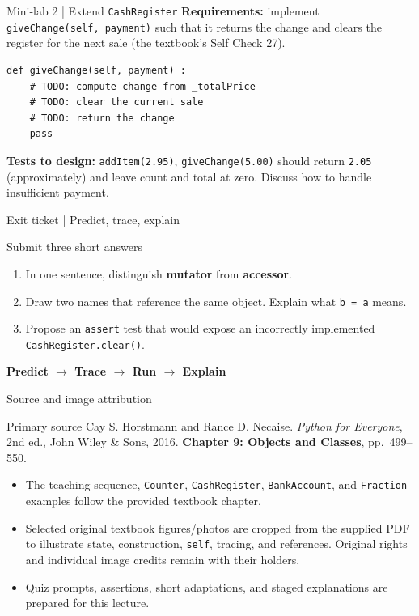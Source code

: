 \documentclass[10pt,aspectratio=169]{beamer}
\begin{document}
\begin{frame}[fragile]{Mini-lab 2 | Extend \texttt{CashRegister}}
\textbf{Requirements:} implement \texttt{giveChange(self, payment)} such that it returns the change and clears the register for the next sale (the textbook's Self Check 27).
\begin{lstlisting}
def giveChange(self, payment) :
    # TODO: compute change from _totalPrice
    # TODO: clear the current sale
    # TODO: return the change
    pass
\end{lstlisting}
\small\textbf{Tests to design:} \texttt{addItem(2.95)}, \texttt{giveChange(5.00)} should return \texttt{2.05} (approximately) and leave count and total at zero. Discuss how to handle insufficient payment.
\end{frame}

\begin{frame}{Exit ticket | Predict, trace, explain}
\begin{block}{Submit three short answers}
\begin{enumerate}\setlength{\itemsep}{8pt}
\item In one sentence, distinguish \textbf{mutator} from \textbf{accessor}.
\item Draw two names that reference the same object. Explain what \texttt{b = a} means.
\item Propose an \texttt{assert} test that would expose an incorrectly implemented \texttt{CashRegister.clear()}.
\end{enumerate}
\end{block}
\begin{center}\textbf{Predict $\longrightarrow$ Trace $\longrightarrow$ Run $\longrightarrow$ Explain}\end{center}
\end{frame}

\begin{frame}{Source and image attribution}
\begin{block}{Primary source}
Cay S. Horstmann and Rance D. Necaise. \emph{Python for Everyone}, 2nd ed., John Wiley \& Sons, 2016. \textbf{Chapter 9: Objects and Classes}, pp.~499--550.
\end{block}
\begin{itemize}
\item The teaching sequence, \texttt{Counter}, \texttt{CashRegister}, \texttt{BankAccount}, and \texttt{Fraction} examples follow the provided textbook chapter.
\item Selected original textbook figures/photos are cropped from the supplied PDF to illustrate state, construction, \texttt{self}, tracing, and references. Original rights and individual image credits remain with their holders.
\item Quiz prompts, assertions, short adaptations, and staged explanations are prepared for this lecture.
\end{itemize}
\end{frame}
\end{document}
